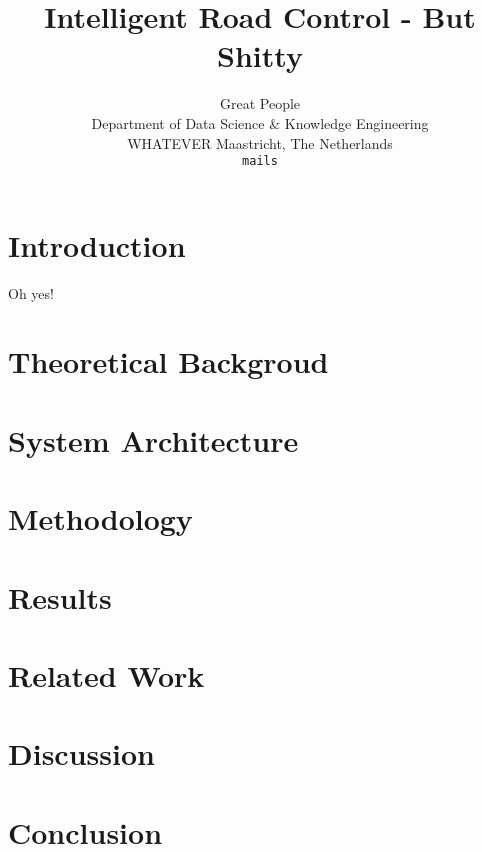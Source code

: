 \documentclass[10pt]{article}
\title{Intelligent Road Control - But Shitty}
\author{Great People \\
	Department of Data Science \& Knowledge Engineering\\
	WHATEVER Maastricht, The Netherlands\\
	{\tt mails}
  }
\begin{document}
\maketitle

\begin{abstract}
	\lipsum[1]
\end{abstract}

\section{Introduction}
	Oh yes! \citep{god0000his}
	\lipsum[2-3]
	
\section{Theoretical Backgroud}
	\lipsum[2-3]
	
\section{System Architecture}
	\lipsum[2-3]
	
\section{Methodology}
	\lipsum[2-3]

\section{Results}
	\lipsum[2-3]

\section{Related Work}
	\lipsum[2-3]

\section{Discussion}
	\lipsum[2-3]
	
\section{Conclusion}
	\lipsum[2-3]

{\tiny\printbibliography}
\end{document}
